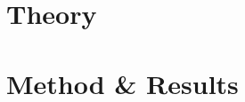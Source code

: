\documentclass[12pt,twoside,onecolumn]{article}
\begin{document}

\newpage\null\newpage


\newpage\null
\tableofcontents{}
\listoffigures{}
\listoftables{}

\newpage\null
{} 
\part{Theory}

\newpage


\newpage\null


\newpage\null
\part{Method \& Results}

\newpage


\newpage\null


\newpage\null


\newpage\null

\newpage\null

\newpage\null

\newpage\null\thispagestyle{empty}\newpage
\end{document}
